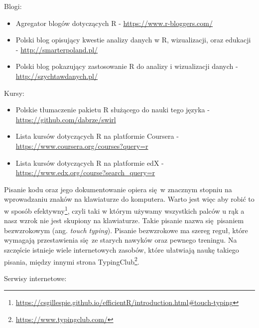 \documentclass[paper=6in:9in,pagesize=pdftex,headinclude=on,footinclude=on,10pt]{scrbook}
\DeclareRobustCommand{\href}[2]{#2\footnote{\url{#1}}}
\providecommand{\tightlist}{%
  \setlength{\itemsep}{0pt}\setlength{\parskip}{0pt}}
\let\BeginKnitrBlock\begin \let\EndKnitrBlock\end
\begin{document}
Blogi:

\begin{itemize}
\tightlist
\item
  Agregator blogów dotyczących R - \url{https://www.r-bloggers.com/}
\item
  Polski blog opisujący kwestie analizy danych w R, wizualizacji, oraz edukacji - \url{http://smarterpoland.pl/}
\item
  Polski blog pokazujący zastosowanie R do analizy i wizualizacji danych - \url{http://szychtawdanych.pl/}
\end{itemize}

Kursy:

\begin{itemize}
\tightlist
\item
  Polskie tłumaczenie pakietu R służącego do nauki tego języka - \url{https://github.com/dabrze/swirl}
\item
  Lista kursów dotyczących R na platformie Coursera - \url{https://www.coursera.org/courses?query=r}
\item
  Lista kursów dotyczących R na platformie edX - \url{https://www.edx.org/course?search_query=r}
\end{itemize}

\BeginKnitrBlock{rmdinfo}
Pisanie kodu oraz jego dokumentowanie opiera się~w znacznym stopniu na wprowadzaniu znaków na klawiaturze do komputera.
Warto jest więc aby robić to w sposób \href{https://csgillespie.github.io/efficientR/introduction.html\#touch-typing}{efektywny}, czyli taki w którym używamy wszystkich palców u rąk a nasz wzrok nie jest skupiony na klawiaturze.
Takie pisanie nazwa się~pisaniem bezwzrokowym (ang. \emph{touch typing}).
Pisanie bezwzrokowe ma szereg reguł, które wymagają przestawienia się~ze starych nawyków oraz pewnego treningu.
Na szczęście istnieje wiele internetowych zasobów, które ułatwiają naukę takiego pisania, między innymi strona \href{https://www.typingclub.com/}{TypingClub}.
\EndKnitrBlock{rmdinfo}

Serwisy internetowe:
\end{document}

